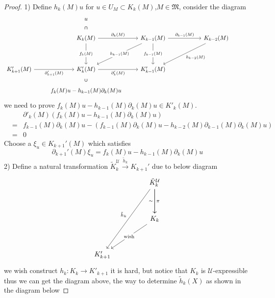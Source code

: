\documentclass{article}
\begin{document}
\begin{proof}
    1) Define $h_k(M) u$ for $u \in U_M \subset K_k(M)$,$M \in \mathfrak{M}$, consider the diagram
    \[\begin{tikzcd}
        & u \\
        & {K_k(M)} & {K_{k-1}(M)} && {K_{k-2}(M)} & {} \\
        \\
        {K'_{k+1}(M)} & {K'_k(M)} & {K'_{k-1}(M)} & {} \\
        & {f_k(M)u-h_{k-1}(M)\partial_k(M)u}
        \arrow["{f_k(M)}"{description}, from=2-2, to=4-2]
        \arrow["\in"{marking}, draw=none, from=5-2, to=4-2]
        \arrow["{\partial'_{k+1}(M)}"', from=4-1, to=4-2]
        \arrow["{h_{k-1}(M)}"{description}, from=2-3, to=4-2]
        \arrow["{\partial_k(M)}", from=2-2, to=2-3]
        \arrow["{\partial'_k(M)}"', from=4-2, to=4-3]
        \arrow["{f_{k-1}(M)}"{description}, from=2-3, to=4-3]
        \arrow["{\partial_{k-1}(M)}", from=2-3, to=2-5]
        \arrow["{h_{k-2}(M)}", from=2-5, to=4-3]
        \arrow["\in"{marking}, draw=none, from=1-2, to=2-2]
    \end{tikzcd}\]
    we need to prove $f_k(M) u - h_{k-1}(M) \partial_k(M) u \in K'_k(M)$.
    \begin{eqnarray*}
    &&\partial'_k(M)(f_k(M)u -h_{k-1}(M)\partial_k(M)u)\\
    &=& f_{k-1}(M)\partial_k(M)u - (f_{k-1}(M)\partial_k(M)u - h_{k-2}(M) \partial_{k-1}(M)\partial_{k}(M)u)\\
    &=& 0
    \end{eqnarray*}
    Choose a $\xi_u \in K_{k+1}'(M)$ which satisfies
    $$
    \partial_{k+1}'(M) \xi_u = f_k(M)u - h_{k-1}(M)\partial_k(M)u
    $$
    2) Define a natural transformation $\tilde{K}_k^\mathcal{U} \xrightarrow{\tilde{h}_k}K_{k+1}'$ due to below diagram
    \[\begin{tikzcd}
        && {\tilde{K}_k^{\mathcal{U}}} \\
        \\
        && {K_k} \\
        \\
        {K'_{k+1}}
        \arrow["{\text{wish}}"{description}, from=3-3, to=5-1]
        \arrow["{\tilde{h}_{k}}"', from=1-3, to=5-1]
        \arrow["\pi", from=1-3, to=3-3]
        \arrow["\sim"', from=1-3, to=3-3]
    \end{tikzcd}\]
    we wish construct $h_k : K_k \to K'_{k+1}$ it is hard, but notice that $K_k$ is $\mathcal{U}$-expressible thus we can get the diagram above, the way to determine $\tilde{h}_k(X)$ as shown in the diagram below

\end{proof}
\end{document}
